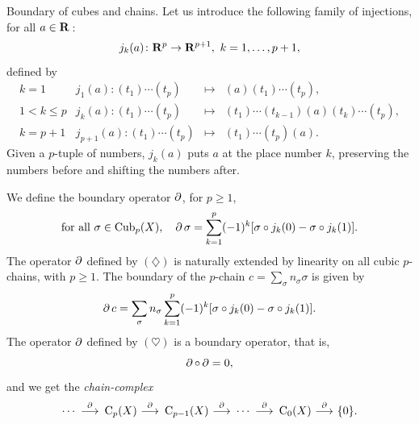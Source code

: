 \begin{Article}{Boundary of cubes and chains.}{}
  Let us introduce the following family of injections,
  for all $a\in\mathbf{R}$\,:
  $$%
    j_k(a) \colon \RR^p \to \RR^{p+1}, \ k = 1, \ldots, p+1,
  $$%
  defined by
  $$%
    \begin{array}{crcl}
    k = 1 & j_1(a) \colon (t_1)\cdots(t_p) & \mapsto & (a)(t_1)\cdots(t_p), \\
    1 < k \leq p & j_k(a) \colon (t_1)\cdots(t_p) & \mapsto & (t_1)\cdots(t_{k-1})(a)(t_k)\cdots(t_p), \\
    k = p+1 & j_{p+1}(a): (t_1)\cdots(t_p) & \mapsto & (t_1)\cdots(t_p)(a).
    \end{array}
  $$%
  Given a $p$-tuple of numbers,
  $j_k(a)$ puts $a$ at the place number $k$,
  preserving the numbers before and shifting the numbers after.

  We define the boundary operator $\operatorname{\partial}$,
  for $p \geq 1$,
  \begin{equation}
    \renewcommand{\theequation}{$\diamondsuit$}
    \text{for all } \sigma \in \DCubes{p}(X),
    \quad \Boundary\sigma =  \sum_{k = 1}^p (-1)^k[\sigma \circ j_k(0) - \sigma \circ j_k(1)].
  \end{equation}
  The operator $\operatorname{\partial}$ defined by $(\diamondsuit)$ is naturally extended by linearity on all cubic $p$-chains,
  with $p \geq 1$.
  The boundary of the $p$-chain $c = \sum_\sigma n_\sigma \sigma$ is given by
  \begin{equation}
    \renewcommand{\theequation}{$\heartsuit$}
    \Boundary c = \sum_\sigma n_\sigma \sum_{k = 1}^p (-1)^k[\sigma \circ j_k(0) - \sigma \circ j_k(1)].
  \end{equation}
  The operator $\operatorname{\partial}$ defined by $(\heartsuit)$ is a boundary operator,
  that is,
  $$%
    \Boundary \circ \Boundary = 0,$$%
  and we get the \emph{chain-complex}
  \begin{equation}
    \renewcommand{\theequation}{$\clubsuit$}
    \cdots
    {\buildrel\Boundary\over{\ \longrightarrow \ }}
    \DChains{p}(X)
    {\buildrel\Boundary\over{\ \longrightarrow \ }}
    \DChains{p-1}(X)
    {\buildrel\Boundary\over{\ \longrightarrow \ }}
    \cdots
    {\buildrel\Boundary\over{\ \longrightarrow \ }}
    \DChains{0}(X)
    {\buildrel\Boundary\over{\ \longrightarrow \ }}
    \{0\}.
  \end{equation}
\end{Article}


